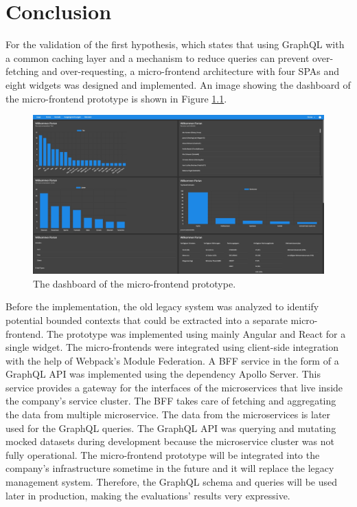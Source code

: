 \chapter{Conclusion}\label{chapter:conclusion}

\noindent For the validation of the first hypothesis, which states that using GraphQL with a common caching layer and a mechanism to reduce queries can prevent over-fetching and over-requesting, a micro-frontend architecture with four \acp{SPA} and eight widgets was designed and implemented. An image showing the dashboard of the micro-frontend prototype is shown in Figure \ref{fig:conclusion:ui-dashboard}.

\ifshowImages
  \begin{figure}[H]
    \centering
    \includegraphics[width=1\linewidth]{images/prototype-screenshots/ui-dashboard.png}
    \caption{The dashboard of the micro-frontend prototype.}\label{fig:conclusion:ui-dashboard}
  \end{figure}
\fi

\noindent Before the implementation, the old legacy system was analyzed to identify potential bounded contexts that could be extracted into a separate micro-frontend. The prototype was implemented using mainly Angular and React for a single widget. The micro-frontends were integrated using client-side integration with the help of Webpack's Module Federation. A \ac{BFF} service in the form of a GraphQL \ac{API} was implemented using the dependency Apollo Server. This service provides a gateway for the interfaces of the microservices that live inside the company's service cluster. The \ac{BFF} takes care of fetching and aggregating the data from multiple microservice. The data from the microservices is later used for the GraphQL queries. The GraphQL \ac{API} was querying and mutating mocked datasets during development because the microservice cluster was not fully operational. The micro-frontend prototype will be integrated into the company's infrastructure sometime in the future and it will replace the legacy management system. Therefore, the GraphQL schema and queries will be used later in production, making the evaluations' results very expressive.

